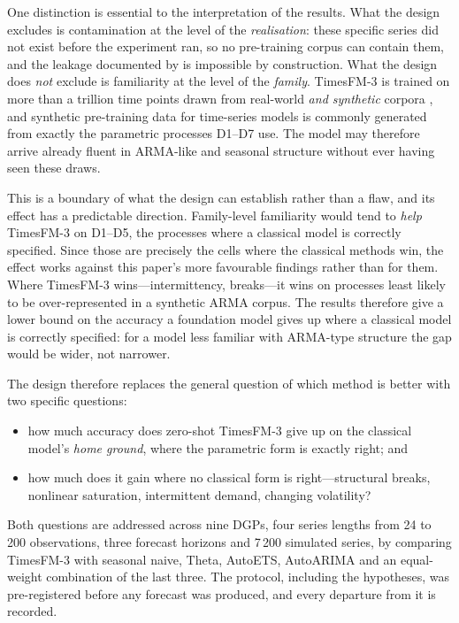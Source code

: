 \documentclass[article]{ajs}
\begin{document}
One distinction is essential to the interpretation of the results.
What the design excludes is contamination at the level of the \emph{realisation}: these specific
series did not exist before the experiment ran, so no pre-training corpus can contain them, and
the leakage documented by \citet{meyer2025leakage} is impossible by construction. What the design
does \emph{not} exclude is familiarity at the level of the \emph{family}. TimesFM-3 is trained on
more than a trillion time points drawn from real-world \emph{and synthetic} corpora
\citep{timesfm3blog}, and synthetic pre-training data for time-series models is commonly
generated from exactly the parametric processes D1--D7 use. The model may therefore arrive
already fluent in ARMA-like and seasonal structure without ever having seen these draws.

This is a boundary of what the design can establish rather than a flaw, and its effect has a
predictable direction. Family-level familiarity would tend to \emph{help} TimesFM-3 on D1--D5,
the processes where a classical model is correctly specified. Since those are precisely the
cells where the classical methods win, the effect works against this paper's more favourable
findings rather than for them. Where TimesFM-3 wins---intermittency, breaks---it wins on
processes least likely to be over-represented in a synthetic ARMA corpus. The results
therefore give a lower bound on the accuracy a foundation model gives up where a classical model
is correctly specified: for a model less familiar with ARMA-type structure the gap would be wider,
not narrower.

The design therefore replaces the general question of which method is better with two specific
questions:

\begin{itemize}
\item how much accuracy does zero-shot TimesFM-3 give up on the classical model's
      \emph{home ground}, where the parametric form is exactly right; and
\item how much does it gain where no classical form is right---structural breaks,
      nonlinear saturation, intermittent demand, changing volatility?
\end{itemize}

Both questions are addressed across nine DGPs, four series lengths from 24 to 200
observations, three forecast horizons and 7\,200 simulated series, by comparing TimesFM-3 with seasonal naive, Theta,
AutoETS, AutoARIMA and an equal-weight combination of the last three. The protocol, including
the hypotheses, was pre-registered before any forecast was produced, and every departure from
it is recorded.
\end{document}

